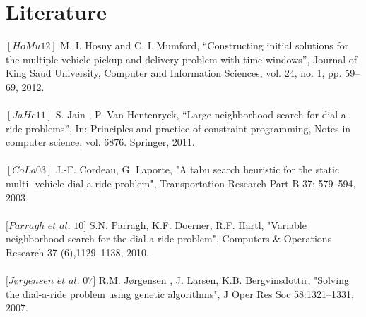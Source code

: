 \documentclass[fleqn]{scrartcl}
\begin{document}
\section{Literature}
$[HoMu 12]$ M. I. Hosny and C. L.Mumford, “Constructing initial solutions for the multiple vehicle pickup and delivery problem with time windows”, Journal of King Saud University, Computer and Information Sciences, vol. 24, no. 1, pp. 59–69, 2012.
\\
\\
$[JaHe 11]$ S. Jain , P. Van Hentenryck, “Large neighborhood search for dial-a-ride problems”, In: Principles and practice of constraint programming, Notes in computer science, vol. 6876. Springer, 2011.
\\
\\
$[CoLa 03]$ J.-F. Cordeau, G. Laporte, "A tabu search heuristic for the static multi- vehicle dial-a-ride problem", Transportation Research Part B 37: 579–594, 2003
\\
\\
$[Parragh$  $et$  $al.$ $10]$ S.N. Parragh, K.F. Doerner, R.F. Hartl, "Variable neighborhood search for the dial-a-ride problem", Computers \& Operations Research 37 (6),1129–1138, 2010. 
\\
\\
$[Jørgensen$ $et$ $al.$ $07]$ R.M. Jørgensen , J. Larsen, K.B. Bergvinsdottir, "Solving the dial-a-ride problem using genetic algorithms", J Oper Res Soc 58:1321–1331, 2007.
\end{document}
